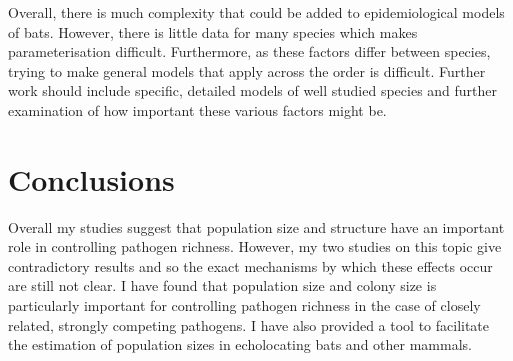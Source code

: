 Overall, there is much complexity that could be added to epidemiological models of bats.
However, there is little data for many species which makes parameterisation difficult.
Furthermore, as these factors differ between species, trying to make general models that apply across the order is difficult.
Further work should include specific, detailed models of well studied species and further examination of how important these various factors might be.




\section{Conclusions}


Overall my studies suggest that population size and structure have an important role in controlling pathogen richness. 
However, my two studies on this topic give contradictory results and so the exact mechanisms by which these effects occur are still not clear.
I have found that population size and colony size is particularly important for controlling pathogen richness in the case of closely related, strongly competing pathogens.
I have also provided a tool to facilitate the estimation of population sizes in echolocating bats and other mammals.



